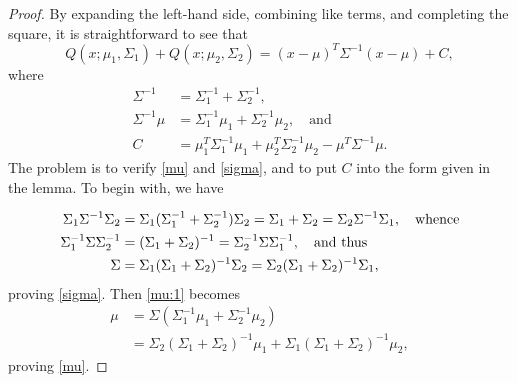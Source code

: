 \documentclass[12pt,leqno]{article}
\begin{document}
\begin{proof}

  By expanding the left-hand side, combining like terms, and completing the
  square, it is straightforward to see that
$$
Q(x;\mu_1,\Sigma_1) + Q(x;\mu_2,\Sigma_2) = (x-\mu)^T\Sigma^{-1}(x-\mu) + C,
$$
where
\begin{align}
 \Sigma^{-1} &= \Sigma_1^{-1} + \Sigma_2^{-1},\label{Sigma}\\
  \Sigma^{-1}\mu &=\Sigma_1^{-1}\mu_1+\Sigma_2^{-1}\mu_2, \quad\text{and}\label{mu:1}\\
  C &= \mu_1^T\Sigma_1^{-1}\mu_1 +\mu_2^T\Sigma_2^{-1}\mu_2 - \mu^T\Sigma^{-1}\mu.
  \label{C}
\end{align}
The problem is to verify \eqref{mu} and \eqref{sigma}, and to put $C$ into the form given in the lemma.
 To begin with, we have

\begin{align}
  \Sigma_1\Sigma^{-1}\Sigma_2 &= \Sigma_1(\Sigma_1^{-1}+\Sigma_2^{-1})\Sigma_2 = \Sigma_1+\Sigma_2
  = \Sigma_2\Sigma^{-1}\Sigma_1,\quad\text{whence}\notag\\
  \Sigma_1^{-1}\Sigma\Sigma_2^{-1} &= (\Sigma_1+\Sigma_2)^{-1} = \Sigma_2^{-1}\Sigma\Sigma_1^{-1},\quad\text{and thus}\notag\\
  \Sigma &= \Sigma_1(\Sigma_1 + \Sigma_2)^{-1}\Sigma_2 = \Sigma_2(\Sigma_1+\Sigma_2)^{-1}\Sigma_1,\label{Sigma:1}
\end{align}
proving \eqref{sigma}.  Then \eqref{mu:1} becomes
\begin{equation}\label{mu:2}
  \begin{split}
    \mu &=  \Sigma(\Sigma_1^{-1}\mu_1+\Sigma_2^{-1}\mu_2)\\
    &=\Sigma_2(\Sigma_1+\Sigma_2)^{-1}\mu_1+\Sigma_1(\Sigma_1+\Sigma_2)^{-1}\mu_2,
  \end{split}
\end{equation}
proving \eqref{mu}.


\end{proof}
\end{document}
